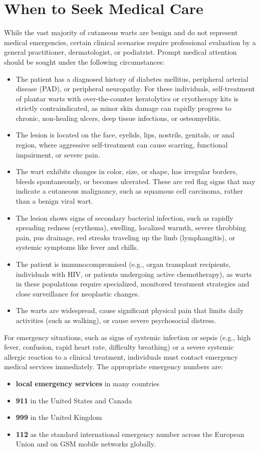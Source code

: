 \section*{When to Seek Medical Care}
While the vast majority of cutaneous warts are benign and do not represent medical emergencies, certain clinical scenarios require professional evaluation by a general practitioner, dermatologist, or podiatrist. Prompt medical attention should be sought under the following circumstances:
\begin{itemize}
    \item The patient has a diagnosed history of diabetes mellitus, peripheral arterial disease (PAD), or peripheral neuropathy. For these individuals, self-treatment of plantar warts with over-the-counter keratolytics or cryotherapy kits is strictly contraindicated, as minor skin damage can rapidly progress to chronic, non-healing ulcers, deep tissue infections, or osteomyelitis.
    \item The lesion is located on the face, eyelids, lips, nostrils, genitals, or anal region, where aggressive self-treatment can cause scarring, functional impairment, or severe pain.
    \item The wart exhibits changes in color, size, or shape, has irregular borders, bleeds spontaneously, or becomes ulcerated. These are red flag signs that may indicate a cutaneous malignancy, such as squamous cell carcinoma, rather than a benign viral wart.
    \item The lesion shows signs of secondary bacterial infection, such as rapidly spreading redness (erythema), swelling, localized warmth, severe throbbing pain, pus drainage, red streaks traveling up the limb (lymphangitis), or systemic symptoms like fever and chills.
    \item The patient is immunocompromised (e.g., organ transplant recipients, individuals with HIV, or patients undergoing active chemotherapy), as warts in these populations require specialized, monitored treatment strategies and close surveillance for neoplastic changes.
    \item The warts are widespread, cause significant physical pain that limits daily activities (such as walking), or cause severe psychosocial distress.
\end{itemize}
For emergency situations, such as signs of systemic infection or sepsis (e.g., high fever, confusion, rapid heart rate, difficulty breathing) or a severe systemic allergic reaction to a clinical treatment, individuals must contact emergency medical services immediately. The appropriate emergency numbers are:
\begin{itemize}
    \item \textbf{local emergency services} in many countries
    \item \textbf{911} in the United States and Canada
    \item \textbf{999} in the United Kingdom
    \item \textbf{112} as the standard international emergency number across the European Union and on GSM mobile networks globally.
\end{itemize}

